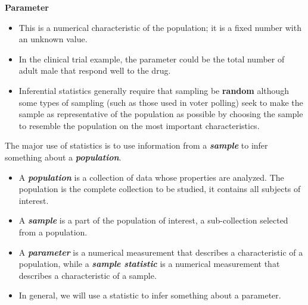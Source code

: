 ﻿\documentclass[]{report}
\begin{document}
\noindent \textbf{Parameter}
\begin{itemize}
\item This is a numerical characteristic of the population; it is
a fixed number with an unknown value.\\ \vspace{0.2cm}
\item In the clinical trial example, the parameter could be the total
number of adult male that respond well to the drug. \vspace{0.2cm}
\end{itemize}



\begin{itemize}
\item Inferential statistics generally require that sampling be \textbf{random} although some types of sampling (such as those used in voter polling) seek to make the sample as representative of the population as possible by choosing the sample to resemble the population on the most important characteristics.
\end{itemize}

The major use of statistics is to use information from a \textit{\textbf{sample}} to infer something about a \textit{\textbf{population}}.
\begin{itemize}


\item A \textit{\textbf{population}} is a collection of data whose properties are analyzed. The population is the complete collection to be studied, it contains all subjects of interest.

\item A \textit{\textbf{sample}} is a part of the population of interest, a sub-collection selected from a population.

\item
A \textit{\textbf{parameter}} is a numerical measurement that describes a characteristic of a population, while a \textit{\textbf{sample statistic}} is a numerical measurement that describes a characteristic of a sample.

\item In general, we will use a statistic to infer something about a parameter. 
\end{itemize}
\end{document}
